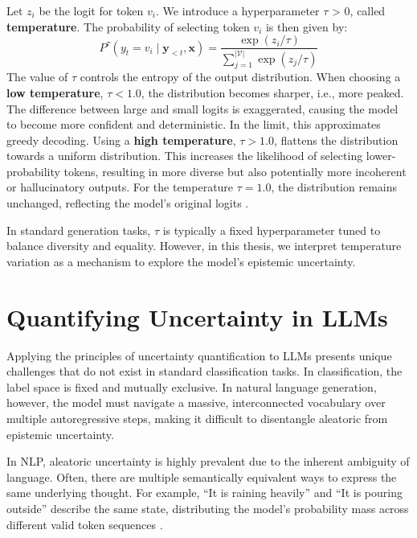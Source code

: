 Let $z_i$ be the logit for token $v_i$. We introduce a hyperparameter
$\tau$ > 0, called \textbf{temperature}. 
The probability of selecting token $v_i$ is then given by:
\begin{equation}
    P^\tau(y_t = v_i \mid \mathbf{y}_{<t}, \mathbf{x})
    = \frac{\exp(z_i/\tau)}{\sum_{j = 1}^{|\mathcal{V}|} \exp(z_j/\tau)}
    \label{eq:temperature_scaling}
\end{equation}
The value of $\tau$ controls the entropy of the output distribution.
When choosing a \textbf{low temperature}, $\tau < 1.0$, the 
distribution becomes sharper, i.e., more peaked. The difference 
between large and small logits is exaggerated, causing the model 
to become more confident and deterministic. In the limit, this 
approximates greedy decoding. 
Using a \textbf{high temperature}, $\tau > 1.0$, flattens the 
distribution towards a uniform distribution. This increases the 
likelihood of selecting lower-probability tokens, resulting in 
more diverse but also potentially more incoherent or hallucinatory
outputs. For the temperature $\tau = 1.0$, the distribution remains
unchanged, reflecting the model's original logits 
\parencite{hinton2015distilling}.

In standard generation tasks, $\tau$ is typically a fixed 
hyperparameter
tuned to balance diversity and equality. However, in this thesis, we 
interpret temperature variation as a mechanism to explore the model's 
epistemic uncertainty. 


\section{Quantifying Uncertainty in LLMs}
\label{sec:background:quantifying_uncertainty_in_llms}
Applying the principles of uncertainty quantification to LLMs
presents unique challenges that do not exist in standard 
classification tasks. In classification, the label space is fixed
and mutually exclusive. In natural language generation, however,
the model must navigate a massive, interconnected vocabulary over
multiple autoregressive steps, making it difficult to disentangle
aleatoric from epistemic uncertainty.

In NLP, aleatoric uncertainty
is highly prevalent due to the inherent ambiguity of language.
Often, there are multiple semantically equivalent ways to express the
same underlying thought. For example, ``It is raining heavily'' and
``It is pouring outside'' describe the same state, distributing the 
model’s probability mass across different valid token sequences 
\parencite{kuhn2023semanticuncertaintylinguisticinvariances}.

